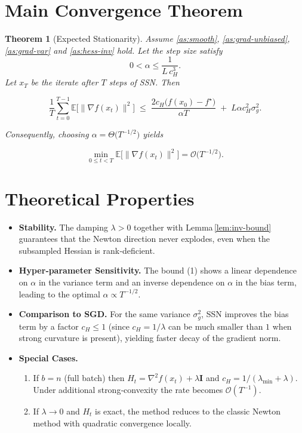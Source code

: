 \documentclass{article}
\newtheorem{theorem}{Theorem}
\newcommand{\E}{\mathbb{E}}
\newcommand{\Id}{\mathbf I}
\begin{document}
\section*{Main Convergence Theorem}
\begin{theorem}[Expected Stationarity]\label{thm:main}
Assume \ref{as:smooth}, \ref{as:grad-unbiased}, \ref{as:grad-var} and \ref{as:hess-inv} hold.
Let the step size satisfy 
\[
0<\alpha\le \frac{1}{L\,c_H^{3}} .
\tag{*}
\]
Let $x_T$ be the iterate after $T$ steps of SSN. Then  

\[
\frac1T\sum_{t=0}^{T-1}\E\big[\|\nabla f(x_t)\|^2\big]
\;\le\;
\frac{2c_H\big(f(x_0)-f^\star\big)}{\alpha T}
\;+\;
L\alpha c_H^{2}\sigma_g^{2}.
\tag{1}
\]

Consequently, choosing $\alpha=\Theta\!\big(T^{-1/2}\big)$ yields  

\[
\min_{0\le t<T}\E\big[\|\nabla f(x_t)\|^2\big]=\mathcal{O}\!\big(T^{-1/2}\big).
\]
\end{theorem}

\section*{Theoretical Properties}
\begin{itemize}
\item \textbf{Stability.} The damping $\lambda>0$ together with Lemma \ref{lem:inv-bound} guarantees that the Newton direction never explodes, even when the subsampled Hessian is rank‑deficient.
\item \textbf{Hyper‑parameter Sensitivity.} The bound (1) shows a linear dependence on $\alpha$ in the variance term and an inverse dependence on $\alpha$ in the bias term, leading to the optimal $\alpha\propto T^{-1/2}$.
\item \textbf{Comparison to SGD.} For the same variance $\sigma_g^2$, SSN improves the bias term by a factor $c_H\le 1$ (since $c_H=1/\lambda$ can be much smaller than $1$ when strong curvature is present), yielding faster decay of the gradient norm.
\item \textbf{Special Cases.}
    \begin{enumerate}
        \item If $b=n$ (full batch) then $H_t=\nabla^2 f(x_t)+\lambda\Id$ and $c_H=1/(\lambda_{\min}+\lambda)$. Under additional strong‑convexity the rate becomes $\mathcal{O}(T^{-1})$.
        \item If $\lambda\to0$ and $H_t$ is exact, the method reduces to the classic Newton method with quadratic convergence locally.
    \end{enumerate}
\end{itemize}
\end{document}

